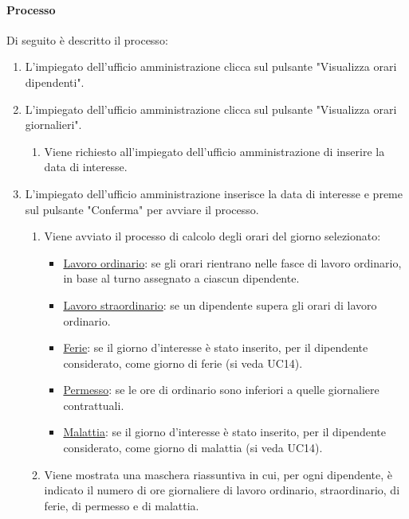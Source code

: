 \paragraph{Processo}
Di seguito è descritto il processo:
\begin{enumerate}
	\item L'impiegato dell'ufficio amministrazione clicca sul pulsante "Visualizza orari dipendenti".
	\item L'impiegato dell'ufficio amministrazione clicca sul pulsante "Visualizza orari giornalieri".
		\begin{enumerate}
			\item Viene richiesto all'impiegato dell'ufficio amministrazione di inserire la data di interesse.
		\end{enumerate}
	\item L'impiegato dell'ufficio amministrazione inserisce la data di interesse e preme sul pulsante "Conferma" per avviare il processo.
		\begin{enumerate}
			\item Viene avviato il processo di calcolo degli orari del giorno selezionato:
				\begin{itemize}
					\item \underline{Lavoro ordinario}: se gli orari rientrano nelle fasce di lavoro ordinario, in base al turno assegnato a ciascun dipendente.
					\item \underline{Lavoro straordinario}: se un dipendente supera gli orari di lavoro ordinario.
					\item \underline{Ferie}: se il giorno d'interesse è stato inserito, per il dipendente considerato, come giorno di ferie (si veda UC14).
					\item \underline{Permesso}: se le ore di ordinario sono inferiori a quelle giornaliere contrattuali.
					\item \underline{Malattia}: se il giorno d'interesse è stato inserito, per il dipendente considerato, come giorno di malattia (si veda UC14).
				\end{itemize}
			\item Viene mostrata una maschera riassuntiva in cui, per ogni dipendente, è indicato il numero di ore giornaliere di lavoro ordinario, straordinario, di ferie, di permesso e di malattia.
		\end{enumerate}	
\end{enumerate}
